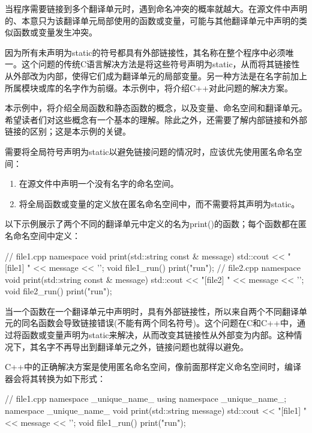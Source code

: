 
当程序需要链接到多个翻译单元时，遇到命名冲突的概率就越大。在源文件中声明的、本意只为该翻译单元局部使用的函数或变量，可能与其他翻译单元中声明的类似函数或变量发生冲突。

因为所有未声明为static的符号都具有外部链接性，其名称在整个程序中必须唯一。这个问题的传统C语言解决方法是将这些符号声明为static，从而将其链接性从外部改为内部，使得它们成为翻译单元的局部变量。另一种方法是在名字前加上所属模块或库的名字作为前缀。本示例中，将介绍C++对此问题的解决方案。


本示例中，将介绍全局函数和静态函数的概念，以及变量、命名空间和翻译单元。希望读者们对这些概念有一个基本的理解。除此之外，还需要了解内部链接和外部链接的区别；这是本示例的关键。


需要将全局符号声明为static以避免链接问题的情况时，应该优先使用匿名命名空间：

\begin{enumerate}
\item
在源文件中声明一个没有名字的命名空间。

\item
将全局函数或变量的定义放在匿名命名空间中，而不需要将其声明为static。
\end{enumerate}

以下示例展示了两个不同的翻译单元中定义的名为print()的函数；每个函数都在匿名命名空间中定义：

\begin{cpp}
// file1.cpp
namespace
{
    void print(std::string const & message)
    {
        std::cout << "[file1] " << message << '\n';
    }
}
void file1_run()
{
    print("run");
}
// file2.cpp
namespace
{
    void print(std::string const & message)
    {
        std::cout << "[file2] " << message << '\n';
    }
}
void file2_run()
{
    print("run");
}
\end{cpp}


当一个函数在一个翻译单元中声明时，具有外部链接性，所以来自两个不同翻译单元的同名函数会导致链接错误(不能有两个同名符号)。这个问题在C和C++中，通过将函数或变量声明为static来解决，从而改变其链接性从外部变为内部。这种情况下，其名字不再导出到翻译单元之外，链接问题也就得以避免。

C++中的正确解决方案是使用匿名命名空间，像前面那样定义命名空间时，编译器会将其转换为如下形式：

\begin{cpp}
// file1.cpp
namespace _unique_name_ {}
using namespace _unique_name_;
namespace _unique_name_
{
    void print(std::string message)
    {
        std::cout << "[file1] " << message << '\n';
    }
}
void file1_run()
{
    print("run");
}
\end{cpp}

